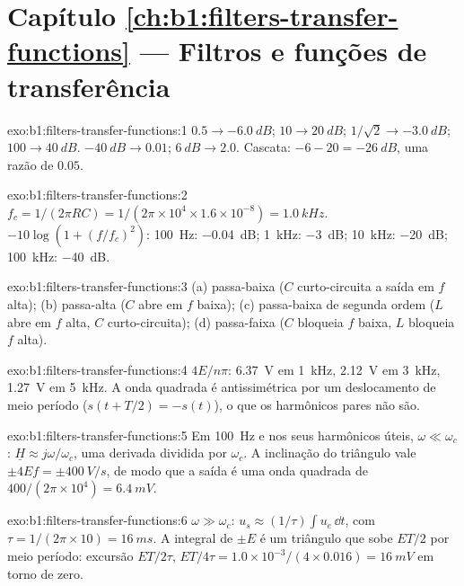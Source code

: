 \section*{Capítulo \ref{ch:b1:filters-transfer-functions} --- Filtros e funções de transferência}

\begin{solution}{exo:b1:filters-transfer-functions:1}
$0.5 \to \qty{-6.0}{dB}$; $10 \to \qty{20}{dB}$; $1/\sqrt2 \to \qty{-3.0}{dB}$;
$100 \to \qty{40}{dB}$. $\qty{-40}{dB} \to 0.01$; $\qty{+6}{dB} \to 2.0$.
Cascata: $-6 - 20 = \qty{-26}{dB}$, uma razão de $0.05$.
\end{solution}

\begin{solution}{exo:b1:filters-transfer-functions:2}
$f_c = 1/(2\pi RC) = 1/(2\pi \times 10^4 \times 1.6\times10^{-8}) =
\qty{1.0}{kHz}$.  $-10\log(1 + (f/f_c)^2)$: \qty{100}{Hz}:
\qty{-0.04}{dB}; \qty{1}{kHz}: \qty{-3}{dB}; \qty{10}{kHz}: \qty{-20}{dB};
\qty{100}{kHz}: \qty{-40}{dB}.
\end{solution}

\begin{solution}{exo:b1:filters-transfer-functions:3}
(a) passa-baixa ($C$ curto-circuita a saída em $f$ alta); (b) passa-alta ($C$
abre em $f$ baixa); (c) passa-baixa de segunda ordem ($L$ abre em $f$ alta,
$C$ curto-circuita); (d) passa-faixa ($C$ bloqueia $f$ baixa, $L$ bloqueia $f$ alta).
\end{solution}

\begin{solution}{exo:b1:filters-transfer-functions:4}
$4E/n\pi$: \qty{6.37}{V} em \qty{1}{kHz}, \qty{2.12}{V} em \qty{3}{kHz},
\qty{1.27}{V} em \qty{5}{kHz}. A onda quadrada é antissimétrica por
um deslocamento de meio período ($s(t + T/2) = -s(t)$), o que os harmônicos pares
não são.
\end{solution}

\begin{solution}{exo:b1:filters-transfer-functions:5}
Em \qty{100}{Hz} e nos seus harmônicos úteis, $\omega \ll \omega_c$:
$\underline H \approx j\omega/\omega_c$, uma derivada dividida por
$\omega_c$. A inclinação do triângulo vale $\pm 4Ef = \pm\qty{400}{V/s}$, de modo que
a saída é uma onda quadrada de  $400/(2\pi \times 10^4) =
\qty{6.4}{mV}$.
\end{solution}

\begin{solution}{exo:b1:filters-transfer-functions:6}
$\omega \gg \omega_c$: $u_s \approx (1/\tau)\int u_e\,\dd t$, com $\tau =
1/(2\pi \times 10) = \qty{16}{ms}$. A integral de $\pm E$ é um
triângulo que sobe $ET/2$ por meio período: excursão $ET/2\tau$, 
$ET/4\tau = 1.0 \times 10^{-3}/(4 \times 0.016) = \qty{16}{mV}$ em torno de
zero.
\end{solution}

